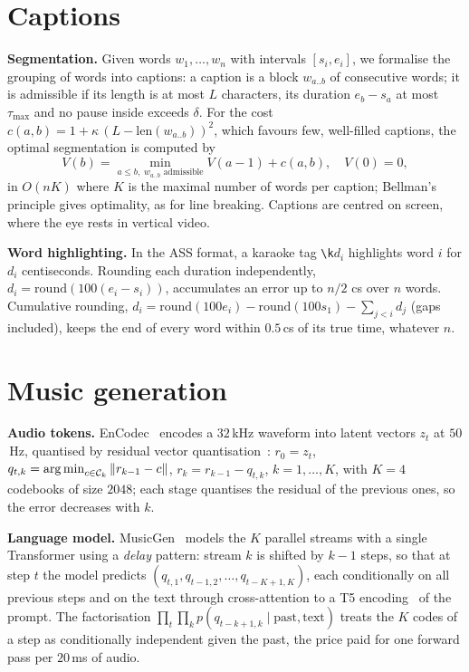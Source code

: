 \documentclass[10pt,twocolumn]{article}
\begin{document}
\section{Captions}
\textbf{Segmentation.} Given words $w_1,\dots,w_n$ with intervals $[s_i,e_i]$, we formalise the grouping of words into captions: a caption is a block $w_{a..b}$ of consecutive words; it is admissible if its length is at most $L$ characters, its duration $e_b-s_a$ at most $\tau_{\max}$ and no pause inside exceeds $\delta$. For the cost $c(a,b)=1+\kappa\,(L-\mathrm{len}(w_{a..b}))^2$, which favours few, well-filled captions, the optimal segmentation is computed by
\begin{equation}
V(b)=\min_{a\le b,\;w_{a..b}\text{ admissible}}V(a-1)+c(a,b),\quad V(0)=0,
\end{equation}
in $O(nK)$ where $K$ is the maximal number of words per caption; Bellman's principle gives optimality, as for line breaking. Captions are centred on screen, where the eye rests in vertical video.

\textbf{Word highlighting.} In the ASS format, a karaoke tag \verb|\k|$d_i$ highlights word $i$ for $d_i$ centiseconds. Rounding each duration independently, $d_i=\mathrm{round}(100(e_i-s_i))$, accumulates an error up to $n/2$ cs over $n$ words. Cumulative rounding, $d_i=\mathrm{round}(100e_i)-\mathrm{round}(100s_1)-\sum_{j<i}d_j$ (gaps included), keeps the end of every word within $0.5$\,cs of its true time, whatever $n$.

\section{Music generation}
\textbf{Audio tokens.} EnCodec~\cite{defossez2023} encodes a $32$\,kHz waveform into latent vectors $z_t$ at $50$\,Hz, quantised by residual vector quantisation~\cite{zeghidour2021}: $r_0=z_t$, $q_{t,k}=\operatorname*{arg\,min}_{c\in\mathcal C_k}\|r_{k-1}-c\|$, $r_k=r_{k-1}-q_{t,k}$, $k=1,\dots,K$, with $K=4$ codebooks of size $2048$; each stage quantises the residual of the previous ones, so the error decreases with $k$.

\textbf{Language model.} MusicGen~\cite{copet2023} models the $K$ parallel streams with a single Transformer using a \emph{delay} pattern: stream $k$ is shifted by $k-1$ steps, so that at step $t$ the model predicts $(q_{t,1},q_{t-1,2},\dots,q_{t-K+1,K})$, each conditionally on all previous steps and on the text through cross-attention to a T5 encoding~\cite{raffel2020} of the prompt. The factorisation $\prod_t\prod_kp(q_{t-k+1,k}\mid\text{past},\text{text})$ treats the $K$ codes of a step as conditionally independent given the past, the price paid for one forward pass per $20$\,ms of audio.
\end{document}
